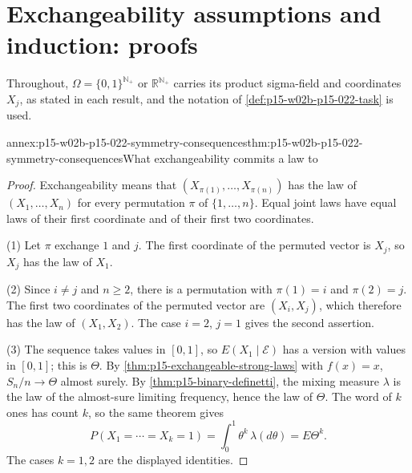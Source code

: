 \section{Exchangeability assumptions and induction: proofs}
\label{sec:annex-p15-w02b-p15-022}

Throughout, \(\Omega=\{0,1\}^{\mathbb N_+}\) or \(\mathbb R^{\mathbb N_+}\)
carries its product sigma-field and coordinates \(X_j\), as stated in each
result, and the notation of \cref{def:p15-w02b-p15-022-task} is used.

\begin{annexitem}{annex:p15-w02b-p15-022-symmetry-consequences}{thm:p15-w02b-p15-022-symmetry-consequences}{What exchangeability commits a law to}
\begin{proof}
Exchangeability means that
\((X_{\pi(1)},\ldots,X_{\pi(n)})\) has the law of \((X_1,\ldots,X_n)\) for
every permutation \(\pi\) of \(\{1,\ldots,n\}\). Equal joint laws have
equal laws of their first coordinate and of their first two coordinates.

(1) Let \(\pi\) exchange \(1\) and \(j\). The first coordinate of the
permuted vector is \(X_j\), so \(X_j\) has the law of \(X_1\).

(2) Since \(i\neq j\) and \(n\geq2\), there is a permutation with
\(\pi(1)=i\) and \(\pi(2)=j\). The first two coordinates of the permuted
vector are \((X_i,X_j)\), which therefore has the law of \((X_1,X_2)\).
The case \(i=2\), \(j=1\) gives the second assertion.

(3) The sequence takes values in \([0,1]\), so
\(E(X_1\mid\mathcal E)\) has a version with values in \([0,1]\); this is
\(\Theta\). By \cref{thm:p15-exchangeable-strong-laws} with
\(f(x)=x\), \(S_n/n\to\Theta\) almost surely. By
\cref{thm:p15-binary-definetti}, the mixing measure \(\lambda\) is the law
of the almost-sure limiting frequency, hence the law of \(\Theta\). The
word of \(k\) ones has count \(k\), so the same theorem gives
\[
 P(X_1=\cdots=X_k=1)=\int_0^1\theta^k\,\lambda(d\theta)=E\Theta^k .
\]
The cases \(k=1,2\) are the displayed identities.
\end{proof}
\end{annexitem}

